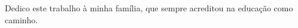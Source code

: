 \begin{dedicatoria}
 \vspace*{\fill}
 \noindent
  \raggedleft
 \begin{minipage}{.54\textwidth}
    Dedico este trabalho à minha família, que sempre acreditou na educação como caminho.
   \end{minipage}
\end{dedicatoria}

